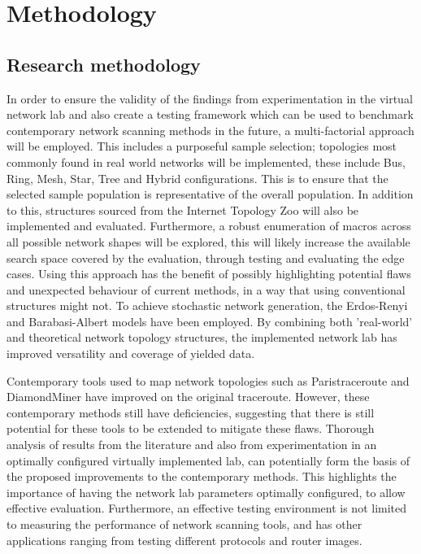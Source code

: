 \section{Methodology}

\subsection{Research methodology}

 In order to ensure the validity of the findings from experimentation in the virtual network lab and also create a testing framework which can be used to benchmark contemporary network scanning methods in the future, a multi-factorial approach will be employed. This includes a purposeful sample selection; topologies most commonly found in real world networks will be implemented, these include Bus, Ring, Mesh, Star, Tree and Hybrid configurations. This is to ensure that the selected sample population is representative of the overall population. In addition to this, structures sourced from the Internet Topology Zoo will also be implemented and evaluated. Furthermore, a robust enumeration of macros across all possible network shapes will be explored, this will likely increase the available search space covered by the evaluation, through testing and evaluating the edge cases. Using this approach has the benefit of possibly highlighting potential flaws and unexpected behaviour of current methods, in a way that using conventional structures might not. To achieve stochastic network generation, the Erdos-Renyi and Barabasi-Albert models have been employed. By combining both  'real-world' and theoretical network topology structures, the implemented network lab has improved versatility and coverage of yielded data.  

Contemporary tools used to map network topologies such as Paristraceroute\cite{anomalies} and DiamondMiner\cite{diamond-miner} have improved on the original traceroute. However, these contemporary methods still have deficiencies, suggesting that there is still potential for these tools to be extended to mitigate these flaws. Thorough analysis of results from the literature and also from experimentation in an optimally configured virtually implemented lab, can potentially form the basis of the proposed improvements to the contemporary methods. This highlights the importance of having the network lab parameters optimally configured, to allow effective evaluation. Furthermore, an effective testing environment is not limited to measuring the performance of network scanning tools, and has other applications ranging from testing different protocols and router images. 

